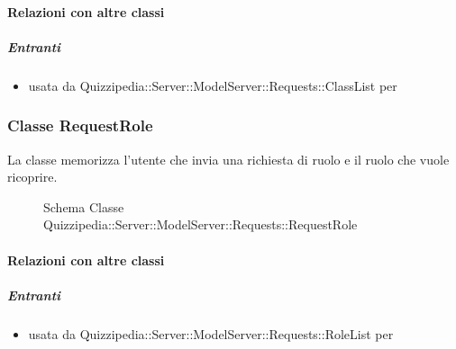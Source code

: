 \paragraph{Relazioni con altre classi}
\subparagraph{Entranti}
\begin{itemize}
\item usata da Quizzipedia::Server::ModelServer::Requests::ClassList per 
\end{itemize}
\subsubsection{Classe RequestRole}
La classe memorizza l'utente che invia una richiesta di ruolo e il ruolo che vuole ricoprire.
\begin{figure}[H]
\centering
\noindent{}
\caption[Schema Classe RequestRole]{Schema Classe Quizzipedia::Server::ModelServer::Requests::RequestRole}
\end{figure}
\paragraph{Relazioni con altre classi}
\subparagraph{Entranti}
\begin{itemize}
\item usata da Quizzipedia::Server::ModelServer::Requests::RoleList per 
\end{itemize}
